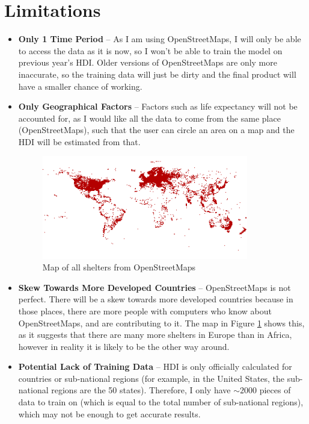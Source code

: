 \documentclass[12pt]{report}
\begin{document}
\section{Limitations}\label{sec:limitations}
\begin{itemize}
    \item \textbf{Only 1 Time Period} -- As I am using OpenStreetMaps, I will only be able to access the data as it is now, so I won't be able to train the model on previous year's HDI. Older versions of OpenStreetMaps are only more inaccurate, so the training data will just be dirty and the final product will have a smaller chance of working.
    \item \textbf{Only Geographical Factors} -- Factors such as life expectancy will not be accounted for, as I would like all the data to come from the same place (OpenStreetMaps), such that the user can circle an area on a map and the HDI will be estimated from that.
    \begin{figure}[H]
        \centering
        \includegraphics[width=9cm]{limitationShelter.png}
        \caption{Map of all shelters from OpenStreetMaps}\label{fig:skewMap}
    \end{figure}
    \item \textbf{Skew Towards More Developed Countries} -- OpenStreetMaps is not perfect. There will be a skew towards more developed countries because in those places, there are more people with computers who know about OpenStreetMaps, and are contributing to it. The map in Figure \ref{fig:skewMap} shows this, as it suggests that there are many more shelters in Europe than in Africa, however in reality it is likely to be the other way around.
    \item \textbf{Potential Lack of Training Data} -- HDI is only officially calculated for countries or sub-national regions (for example, in the United States, the sub-national regions are the 50 states). Therefore, I only have $\sim 2000$ pieces of data to train on (which is equal to the total number of sub-national regions), which may not be enough to get accurate results.
\end{itemize}
\end{document}
